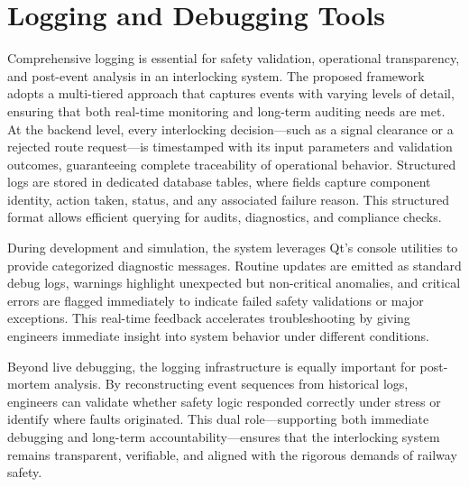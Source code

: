 \section{Logging and Debugging Tools}
\label{sec:implementation:logging-debugging}

Comprehensive logging is essential for safety validation, operational transparency, and post-event analysis in an interlocking system. The proposed framework adopts a multi-tiered approach that captures events with varying levels of detail, ensuring that both real-time monitoring and long-term auditing needs are met. At the backend level, every interlocking decision—such as a signal clearance or a rejected route request—is timestamped with its input parameters and validation outcomes, guaranteeing complete traceability of operational behavior. Structured logs are stored in dedicated database tables, where fields capture component identity, action taken, status, and any associated failure reason. This structured format allows efficient querying for audits, diagnostics, and compliance checks.

During development and simulation, the system leverages Qt’s console utilities to provide categorized diagnostic messages. Routine updates are emitted as standard debug logs, warnings highlight unexpected but non-critical anomalies, and critical errors are flagged immediately to indicate failed safety validations or major exceptions. This real-time feedback accelerates troubleshooting by giving engineers immediate insight into system behavior under different conditions.

Beyond live debugging, the logging infrastructure is equally important for post-mortem analysis. By reconstructing event sequences from historical logs, engineers can validate whether safety logic responded correctly under stress or identify where faults originated. This dual role—supporting both immediate debugging and long-term accountability—ensures that the interlocking system remains transparent, verifiable, and aligned with the rigorous demands of railway safety.